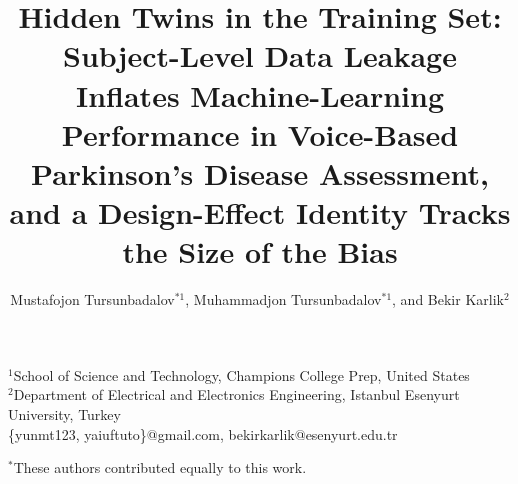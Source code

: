 \documentclass[11pt]{article}
\title{\textbf{Hidden Twins in the Training Set: Subject-Level Data Leakage Inflates Machine-Learning Performance in Voice-Based Parkinson's Disease Assessment, and a Design-Effect Identity Tracks the Size of the Bias}}
\author{Mustafojon Tursunbadalov$^{*1}$, Muhammadjon Tursunbadalov$^{*1}$, and Bekir Karlik$^{2}$}
\date{}
\begin{document}
\maketitle
\vspace{-2em}
\begin{center}
$^1$School of Science and Technology, Champions College Prep, United States\\
$^2$Department of Electrical and Electronics Engineering, Istanbul Esenyurt University, Turkey\\[0.5em]
\{yunmt123, yaiuftuto\}@gmail.com, bekirkarlik@esenyurt.edu.tr
\end{center}
\vspace{1em}
\noindent\footnotesize $^*$These authors contributed equally to this work.\normalsize
\vspace{1em}
\end{document}
